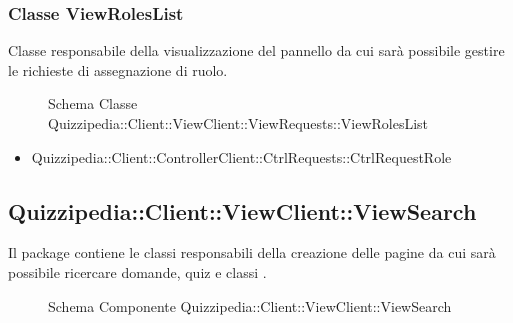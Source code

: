 \subsubsection{Classe ViewRolesList}
Classe responsabile della visualizzazione del pannello da cui sarà possibile gestire le richieste di assegnazione di ruolo.
\begin{figure}[H]
\centering
\noindent{}
\caption{Schema Classe Quizzipedia::Client::ViewClient::ViewRequests::ViewRolesList}
\end{figure}
\begin{itemize}
\item Quizzipedia::Client::ControllerClient::CtrlRequests::CtrlRequestRole
\end{itemize}
\subsection{Quizzipedia::Client::ViewClient::ViewSearch}
Il package contiene le classi responsabili della creazione delle pagine da cui sarà possibile ricercare domande, quiz e classi .
\begin{figure}[H]
\centering
\noindent{}
\caption[Quizzipedia::Client::ViewClient::ViewSearch]{Schema Componente Quizzipedia::Client::ViewClient::ViewSearch}
\end{figure}
